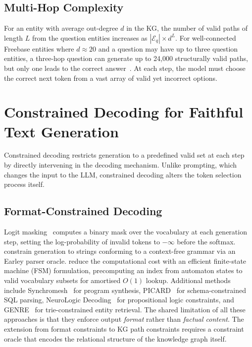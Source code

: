 \subsection{Multi-Hop Complexity}

For an entity with average out-degree $d$ in the KG, the number of valid paths of length $L$ from the question entities increases as $|\mathcal{E}_q| \times d^L$. For well-connected Freebase entities where $d \approx 20$ and a question may have up to three question entities, a three-hop question can generate up to 24{,}000 structurally valid paths, but only one leads to the correct answer~\citep{he2021improving, lan2022survey}. At each step, the model must choose the correct next token from a vast array of valid yet incorrect options.

\section{Constrained Decoding for Faithful Text Generation}
\label{sec:constrained}

Constrained decoding restricts generation to a predefined valid set at each step by directly intervening in the decoding mechanism. Unlike prompting, which changes the input to the LLM, constrained decoding alters the token selection process itself.

\subsection{Format-Constrained Decoding}

Logit masking~\citep{geng2023grammarconstrained, willard2023outlines} computes a binary mask over the vocabulary at each generation step, setting the log-probability of invalid tokens to $-\infty$ before the softmax. \citet{geng2023grammarconstrained} constrain generation to strings conforming to a context-free grammar via an Earley parser oracle. \citet{willard2023outlines} reduce the computational cost with an efficient finite-state machine (FSM) formulation, precomputing an index from automaton states to valid vocabulary subsets for amortised $O(1)$ lookup. Additional methods include Synchromesh~\citep{poesia2022synchromesh} for program synthesis, PICARD~\citep{scholak2021picard} for schema-constrained SQL parsing, NeuroLogic Decoding~\citep{lu2021neurologic} for propositional logic constraints, and GENRE~\citep{decao2021autoregressive} for trie-constrained entity retrieval. The shared limitation of all these approaches is that they enforce output \textit{format} rather than \textit{factual content}. The extension from format constraints to KG path constraints requires a constraint oracle that encodes the relational structure of the knowledge graph itself.


